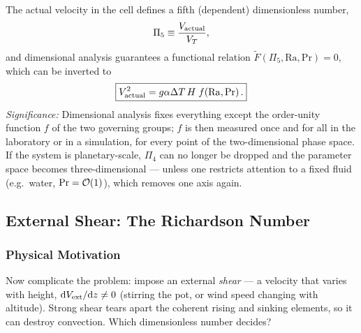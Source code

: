 The actual velocity in the cell defines a fifth (dependent) dimensionless
number,
\begin{equation}
    \Pi_5\equiv\frac{V_{\rm actual}}{V_T},
    \label{eq:lec09:pi5-definition}
\end{equation}
and dimensional analysis guarantees a functional relation
$\tilde F(\Pi_5,\mathrm{Ra},\mathrm{Pr})=0$, which can be inverted to
\begin{equation}
    \boxed{
    V_{\rm actual}^2
    =
    g\alpha\Delta T\,H\;
    f\!\left(\mathrm{Ra},\mathrm{Pr}\right).
    }
    \label{eq:lec09:velocity-scaling}
\end{equation}
\textit{Significance:} Dimensional analysis fixes everything except the
order-unity function $f$ of the two governing groups; $f$ is then measured
once and for all in the laboratory or in a simulation, for every point of the
two-dimensional phase space. If the system is planetary-scale, $\Pi_4$ can no
longer be dropped and the parameter space becomes three-dimensional ---
unless one restricts attention to a fixed fluid (e.g.\ water,
$\mathrm{Pr}=\order{1}$), which removes one axis again.

\subsection{External Shear: The Richardson Number}
\label{sec:lec09:richardson}

\subsubsection*{Physical Motivation}
Now complicate the problem: impose an external \emph{shear} --- a velocity that
varies with height, $\dd V_{\rm ext}/\dd z\neq0$ (stirring the pot, or wind
speed changing with altitude). Strong shear tears apart the coherent rising
and sinking elements, so it can destroy convection. Which dimensionless number
decides?

